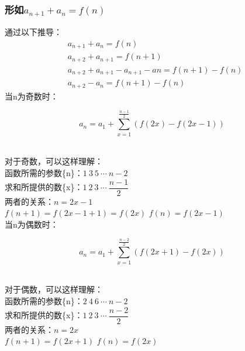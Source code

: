 \documentclass[UTF8]{ctexart}
\begin{document}
\subsubsection{形如{\large$a_{n+1}+a_{n}=f(n)$}}
    通过以下推导：
    \setcounter{equation}{0}
    \begin{align}
        &a_{n+1}+a_{n}=f(n)\\[3mm]
        &a_{n+2}+a_{n+1}=f(n+1)\\[5mm]
        &a_{n+2}+a_{n+1}-a_{n+1}-an=f(n+1)-f(n)\\[3mm]
        &a_{n+2}-a_{n}=f(n+1)-f(n)
    \end{align}
    当n为奇数时：
    \begin{large}
    \begin{equation*}
        a_n=a_1+\sum_{x=1}^{\frac{n-1}{2}}\left(f(2x)-f(2x-1)\right)
    \end{equation*}
    \end{large}\\
    对于奇数，可以这样理解：\\[3mm]
    函数所需的参数\{n\}：$1~3~5~\cdots~n-2$\\[3mm]
    求和所提供的数\{x\}：$1~2~3~\cdots~\dfrac{n-1}{2}$\\[3mm]
    两者的关系：$n=2x-1$\\[3mm]
    $f(n+1)=f(2x-1+1)=f(2x)$\qquad
    $f(n)=f(2x-1)$\\[6mm]
    当n为偶数时：
    \begin{large}
    \begin{equation*}
        a_n=a_1+\sum_{x=1}^{\frac{n-2}{2}}\left(f(2x+1)-f(2x)\right)
    \end{equation*}
    \end{large}\\
    对于偶数，可以这样理解：\\[3mm]
    函数所需的参数\{n\}：$2~4~6~\cdots~n-2$\\[3mm]
    求和所提供的数\{x\}：$1~2~3~\cdots~\dfrac{n-2}{2}$\\[3mm]
    两者的关系：$n=2x$\\[3mm]
    $f(n+1)=f(2x+1)$\qquad
    $f(n)=f(2x)$
    
\newpage
\end{document}
